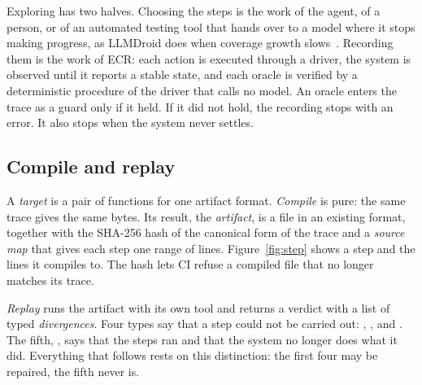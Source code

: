 Exploring has two halves. Choosing the steps is the work of the agent, of a person, or of an automated testing tool that hands over to a model where it stops making progress, as LLMDroid does when coverage growth slows~\cite{wang2025llmdroid}. Recording them is the work of ECR: each action is executed through a driver, the system is observed until it reports a stable state, and each oracle is verified by a deterministic procedure of the driver that calls no model. An oracle enters the trace as a guard only if it held. If it did not hold, the recording stops with an error. It also stops when the system never settles.

\subsection{Compile and replay}

A \emph{target} is a pair of functions for one artifact format. \emph{Compile} is pure: the same trace gives the same bytes. Its result, the \emph{artifact}, is a file in an existing format, together with the SHA-256 hash of the canonical form of the trace and a \emph{source map} that gives each step one range of lines. Figure~\ref{fig:step} shows a step and the lines it compiles to. The hash lets CI refuse a compiled file that no longer matches its trace.

\begin{sloppypar}
\emph{Replay} runs the artifact with its own tool and returns a verdict with a list of typed \emph{divergences}. Four types say that a step could not be carried out: , ,  and . The fifth, , says that the steps ran and that the system no longer does what it did. Everything that follows rests on this distinction: the first four may be repaired, the fifth never is.
\end{sloppypar}

